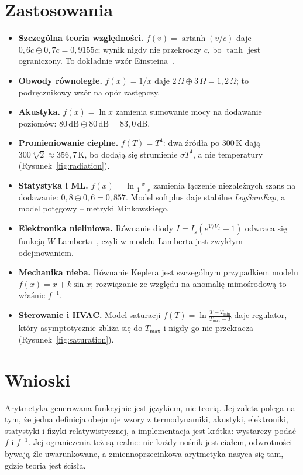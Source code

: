 \documentclass[11pt,a4paper]{article}
\newcommand{\ff}{f^{-1}}
\begin{document}
\section{Zastosowania}

\begin{itemize}
\item \textbf{Szczególna teoria względności.} $f(v)=\operatorname{artanh}(v/c)$
daje $0{,}6c\oplus0{,}7c=0{,}9155c$; wynik nigdy nie przekroczy $c$, bo
$\tanh$ jest ograniczony. To dokładnie wzór Einsteina~\cite{einstein1905}.
\item \textbf{Obwody równoległe.} $f(x)=1/x$ daje $2\,\Omega\oplus3\,\Omega
=1{,}2\,\Omega$; to podręcznikowy wzór na opór zastępczy.
\item \textbf{Akustyka.} $f(x)=\ln x$ zamienia sumowanie mocy na dodawanie
poziomów: $80\,\mathrm{dB}\oplus80\,\mathrm{dB}=83{,}0\,\mathrm{dB}$.
\item \textbf{Promieniowanie cieplne.} $f(T)=T^{4}$: dwa źródła po $300\,\mathrm{K}$
dają $300\sqrt[4]{2}\approx356{,}7\,\mathrm{K}$, bo dodają się strumienie
$\sigma T^{4}$, a nie temperatury (Rysunek~\ref{fig:radiation}).
\item \textbf{Statystyka i ML.} $f(x)=\ln\frac{x}{1-x}$ zamienia łączenie
niezależnych szans na dodawanie: $0{,}8\oplus0{,}6=0{,}857$. Model softplus
daje stabilne \emph{LogSumExp}, a model potęgowy -- metryki Minkowskiego.
\item \textbf{Elektronika nieliniowa.} Równanie diody
$I=I_s(e^{V/V_T}-1)$ odwraca się funkcją $W$ Lamberta~\cite{corless1996}, czyli
w modelu Lamberta jest zwykłym odejmowaniem.
\item \textbf{Mechanika nieba.} Równanie Keplera jest szczególnym przypadkiem
modelu $f(x)=x+k\sin x$; rozwiązanie ze względu na anomalię mimośrodową to
właśnie $\ff$.
\item \textbf{Sterowanie i HVAC.} Model saturacji
$f(T)=\ln\frac{T-T_{\min}}{T_{\max}-T}$ daje regulator, który asymptotycznie
zbliża się do $T_{\max}$ i nigdy go nie przekracza
(Rysunek~\ref{fig:saturation}).
\end{itemize}

\section{Wnioski}

Arytmetyka generowana funkcyjnie jest językiem, nie teorią. Jej zaleta polega na
tym, że jedna definicja obejmuje wzory z termodynamiki, akustyki, elektroniki,
statystyki i fizyki relatywistycznej, a implementacja jest krótka: wystarczy
podać $f$ i $\ff$. Jej ograniczenia też są realne: nie każdy nośnik jest ciałem,
odwrotności bywają źle uwarunkowane, a zmiennoprzecinkowa arytmetyka nasyca się
tam, gdzie teoria jest ścisła.
\end{document}
